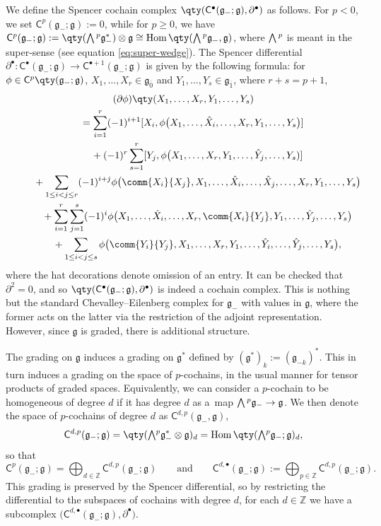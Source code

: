 \documentclass[10pt,a4paper]{amsart}
\numberwithin{equation}{section}
\newcommand{\fg}{\mathfrak{g}}
\newcommand{\ZZ}{\mathbb{Z}}
\newcommand{\ssC}{\mathsf{C}}
\newcommand{\Wedge}{\mathchoice{{\textstyle\bigwedge}}{\bigwedge}{\bigwedge}{\bigwedge}}	%
\newcommand{\1}{\mathbbm{1}}
\DeclareMathOperator{\Hom}{Hom}
\begin{document}
We define the Spencer cochain complex $\qty(\ssC^\bullet(\fg_-;\fg),\partial^\bullet)$ as follows. For $p<0$, we set $\ssC^p(\fg_-;\fg)\allowbreak:=0$, while for $p\geq 0$, we have
$\ssC^p(\fg_-;\fg) := \qty(\Wedge^p \fg_-^*) \otimes \fg \cong \Hom\qty(\Wedge^p \fg_-,\fg)$,
where $\Wedge^p$ is meant in the super-sense (see equation \eqref{eq:super-wedge}). The Spencer differential $\partial^\bullet\colon \ssC^\bullet(\fg_-;\fg)\to \ssC^{\bullet+1}(\fg_-;\fg)$ is given by the following formula: for $\phi\in \ssC^p\qty(\fg_-;\fg)$, $X_1,\dots, X_r\in\fg_{\overline{0}}$ and $Y_1,\dots,Y_s\in\fg_{\overline{1}}$, where $r+s=p+1$,
\begin{gather}
	(\partial\phi)\qty(X_1,\dots,X_r,Y_1,\dots,Y_s)\nonumber\\
\qquad	= \sum_{i=1}^r (-1)^{i+1} [X_i,\phi\bigl(X_1,\dots,\hat{X}_i,\dots,X_r,Y_1,\dots,Y_s\bigr)]	\nonumber\\
\phantom{\qquad=}{}+ (-1)^{r} \sum_{s=1}^r [Y_j,\phi \bigl(X_1,\dots,X_r,Y_1,\dots,\hat{Y}_j,\dots,Y_s)]\nonumber	\\
\phantom{\qquad=}{}+ \sum_{1\leq i<j\leq r} (-1)^{i+j} \phi \bigl(\comm{X_i}{X_j},X_1,\dots,\hat{X}_i,\dots,\hat{X}_j,\dots,X_r,Y_1,\dots,Y_s\bigr)\nonumber	\\
\phantom{\qquad=}{}+ \sum_{i=1}^r\sum_{j=1}^s (-1)^{i} \phi \bigl(X_1,\dots,\hat{X}_i,\dots,X_r,\comm{X_i}{Y_j},Y_1,\dots,\hat{Y}_j,\dots,Y_s\bigr)	\nonumber\\
\phantom{\qquad=}{}+ \sum_{1\leq i<j\leq s} \phi \bigl(\comm{Y_i}{Y_j},X_1,\dots,X_r,Y_1,\dots,\hat{Y}_i,\dots,\hat{Y}_j,\dots,Y_s\bigr),\label{eq:CEdiffLiesuper}
\end{gather}
where the hat decorations denote omission of an entry. It can be checked that $\partial^2=0$, and so $\qty(\ssC^\bullet(\fg_-;\fg),\partial^\bullet)$ is indeed a cochain complex. This is nothing but the standard Chevalley--Eilenberg complex for $\fg_-$ with values in $\fg$, where the former acts on the latter via the restriction of the adjoint representation. However, since $\fg$ is graded, there is additional structure.

The grading on $\fg$ induces a grading on $\fg^*$ defined by $(\fg^*)_k:=(\fg_{-k})^*$. This in turn induces a grading on the space of $p$-cochains, in the usual manner for tensor products of graded spaces. Equivalently, we can consider a $p$-cochain to be homogeneous of degree $d$ if it has degree $d$ as a~map $\Wedge^p \fg_-\to\fg$. We then denote the space of $p$-cochains of degree $d$ as $\ssC^{d,p}(\fg_-,\fg)$,
\begin{equation}\label{eq:spencer-complex-grading}
	\ssC^{d,p}(\fg_-;\fg) = \qty(\Wedge^p \fg_-^*\otimes \fg)_d = \Hom\qty(\Wedge^p \fg_-;\fg)_d,
\end{equation}
so that
\[
	\ssC^p(\fg_-;\fg) = \bigoplus_{d\in\ZZ} \ssC^{d,p}(\fg_-;\fg) \qquad\text{and} \qquad\ssC^{d,\bullet}(\fg_-;\fg) := \bigoplus_{p\in\ZZ} \ssC^{d,p}(\fg_-;\fg).
\]
This grading is preserved by the Spencer differential, so by restricting the differential to the subspaces of cochains with degree $d$, for each $d\in\ZZ$ we have a subcomplex $\bigl(\ssC^{d,\bullet}(\fg_-;\fg),\partial^\bullet\bigr)$.
\end{document}
